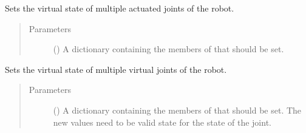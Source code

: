 \documentclass[letterpaper,10pt,english]{sphinxmanual}
\begin{document}
\begin{fulllineitems}
\begin{fulllineitems}
\label{\detokenize{code_docu:trip_kinematics.Robot.Robot.set_actuated_state}}
Sets the virtual state of multiple actuated joints of the robot.
\begin{quote}\begin{description}
\item[{Parameters}] \leavevmode
{} (\sphinxstyleliteralemphasis{\sphinxupquote{{[}}}\sphinxstyleliteralemphasis{\sphinxupquote{, }}\sphinxstyleliteralemphasis{\sphinxupquote{{]}}}) \textendash{} A dictionary containing the members of  that should be set.

\end{description}\end{quote}

\end{fulllineitems}


\begin{fulllineitems}
\label{\detokenize{code_docu:trip_kinematics.Robot.Robot.set_virtual_state}}
Sets the virtual state of multiple virtual joints of the robot.
\begin{quote}\begin{description}
\item[{Parameters}] \leavevmode
{} (\sphinxstyleliteralemphasis{\sphinxupquote{{[}}}\sphinxstyleliteralemphasis{\sphinxupquote{,}}\sphinxstyleliteralemphasis{\sphinxupquote{{[}}}\sphinxstyleliteralemphasis{\sphinxupquote{, }}\sphinxstyleliteralemphasis{\sphinxupquote{{]}}}\sphinxstyleliteralemphasis{\sphinxupquote{{]}}}) \textendash{} A dictionary containing the members of  that should be set.
The new values need to be valid state for the state of the joint.


\end{description}
\end{quote}
\end{fulllineitems}
\end{fulllineitems}
\end{document}
